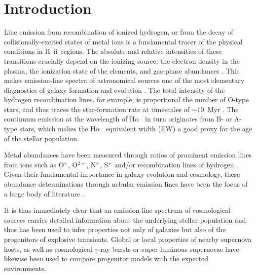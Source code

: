 \documentclass[traditabstract, referee]{aa}
\newcommand{\ha}{H$\alpha$}
\newcommand{\hii}{\mbox{H~{\sc ii}}}
\begin{document}
\maketitle

\section{Introduction}
\label{sec:Intro}

Line emission from recombination of ionized hydrogen, or from the decay of collisionally-excited states of metal ions {is a fundamental tracer of the physical conditions in \hii~regions}. The absolute and relative intensities of these transitions crucially depend on the ionizing source, the electron density in the plasma, the ionization state of the elements, and gas-phase abundances \citep{1989agna.book.....O}. This makes emission-line spectra of astronomical sources one of the most elementary diagnostics of galaxy formation and evolution \citep[e.g.][]{2004ApJ...613..898T, 2006ApJ...644..813E, 2009ApJ...706.1364F}. The total intensity of the hydrogen recombination lines, for example, is proportional the number of O-type stars, and thus traces the star-formation rate at timescales of $\sim10$~Myr \citep[e.g.][]{1998ARA&A..36..189K}. The continuum emission at the wavelength of \ha~ in turn originates from B- or A-type stars, which makes the \ha~ equivalent width (EW) a good proxy for the age of the stellar population.

Metal abundances have been measured through ratios of prominent emission lines from ions such as O$^{+}$, O$^{2+}$, N$^{+}$, S$^{+}$ and/or recombination lines of hydrogen \citep{1979MNRAS.189...95P, 1979A&A....78..200A}. Given their fundamental importance in galaxy evolution and cosmology, these abundance determinations through nebular emission lines have been the focus of a large body of literature \citep[e.g.][]{2004ApJ...617..240K, 2005ApJ...631..231P, 2006A&A...454L.127S, 2006A&A...448..955I, 2008ApJ...681.1183K}.

It is thus immediately clear that an emission-line spectrum of cosmological sources carries detailed information about the underlying stellar population and thus has been used to infer properties not only of galaxies but also of the progenitors of explosive transients. Global \citep[e.g.][]{2008ApJ...673..999P, 2011MNRAS.412.1441L} or local \citep[e.g.][]{2010MNRAS.407.2660A, 2011ApJ...731L...4M, 2011A&A...530A..95L} properties of nearby supernova hosts, as well as cosmological $\gamma$-ray bursts \citep[GRBs, e.g.][]{2007A&A...464..529W, 2012A&A...546A...8K, 2013ApJ...774..119G} or super-luminous supernovae \citep[e.g.][]{2013ApJ...763L..28C, 2014ApJ...787..138L, 2014arXiv1409.8331L, 2016arXiv160408207P} have likewise been used to compare progenitor models with the expected environments. 
\end{document}
